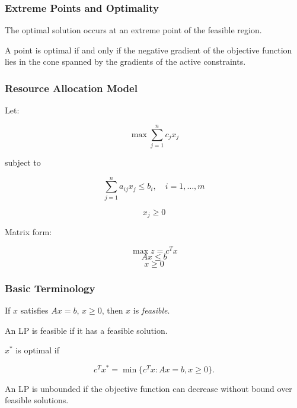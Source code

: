 \subsubsection*{Extreme Points and Optimality}

\begin{Obs}  
The optimal solution occurs at an extreme point of the feasible region.
\end{Obs}

\begin{Obs}  
A point is optimal if and only if the negative gradient of the objective function lies in the cone spanned by the gradients of the active constraints.
\end{Obs}

\subsubsection*{Resource Allocation Model}

Let:

\[
\max \sum_{j=1}^n c_j x_j
\]

subject to

\[
\sum_{j=1}^n a_{ij} x_j \le b_i, \quad i = 1,\dots,m
\]

\[
x_j \ge 0
\]

Matrix form:

\[
\max z = c^T x
\]
\[
Ax \le b
\]
\[
x \ge 0
\]


\subsubsection*{Basic Terminology}

\begin{Def}  
If $x$ satisfies $Ax=b$, $x\ge 0$, then $x$ is \emph{feasible}.
\end{Def}

\begin{Def}
An LP is feasible if it has a feasible solution.
\end{Def}


\begin{Def}
$x^*$ is optimal if

\[
c^T x^* = \min \{c^T x : Ax=b, x\ge 0\}.
\]
\end{Def}

\begin{Def}
An LP is unbounded if the objective function can decrease without bound over feasible solutions.
\end{Def}

